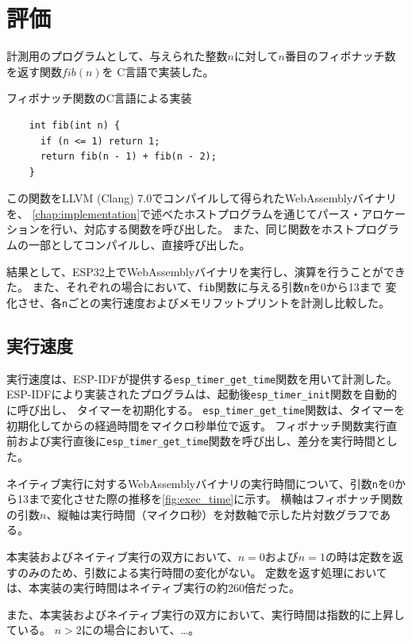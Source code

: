 \chapter{評価}
\label{chap:evaluation}

計測用のプログラムとして、与えられた整数$n$に対して$n$番目のフィボナッチ数を返す関数$fib(n)$を
C言語で実装した。

\begin{itembox}[l]{フィボナッチ関数のC言語による実装}
  \begin{verbatim}
    int fib(int n) {
      if (n <= 1) return 1;
      return fib(n - 1) + fib(n - 2);
    }
  \end{verbatim}
\end{itembox}

この関数をLLVM (Clang) 7.0でコンパイルして得られたWebAssemblyバイナリを、
\ref{chap:implementation}で述べたホストプログラムを通じてパース・アロケーションを行い、対応する関数を呼び出した。
また、同じ関数をホストプログラムの一部としてコンパイルし、直接呼び出した。

結果として、ESP32上でWebAssemblyバイナリを実行し、演算を行うことができた。
また、それぞれの場合において、\verb|fib|関数に与える引数\verb|n|を0から13まで
変化させ、各\verb|n|ごとの実行速度およびメモリフットプリントを計測し比較した。

\section{実行速度}

実行速度は、ESP-IDFが提供する\verb|esp_timer_get_time|関数を用いて計測した。
ESP-IDFにより実装されたプログラムは、起動後\verb|esp_timer_init|関数を自動的に呼び出し、
タイマーを初期化する。
\verb|esp_timer_get_time|関数は、タイマーを初期化してからの経過時間をマイクロ秒単位で返す。
フィボナッチ関数実行直前および実行直後に\verb|esp_timer_get_time|関数を呼び出し、差分を実行時間とした。

ネイティブ実行に対するWebAssemblyバイナリの実行時間について、引数\verb|n|を0から13まで変化させた際の推移を\ref{fig:exec_time}に示す。
横軸はフィボナッチ関数の引数$n$、縦軸は実行時間（マイクロ秒）を対数軸で示した片対数グラフである。

本実装およびネイティブ実行の双方において、$n=0$および$n=1$の時は定数を返すのみのため、引数による実行時間の変化がない。
定数を返す処理においては、本実装の実行時間はネイティブ実行の約260倍だった。

また、本実装およびネイティブ実行の双方において、実行時間は指数的に上昇している。
$n>2$にの場合において、…。

